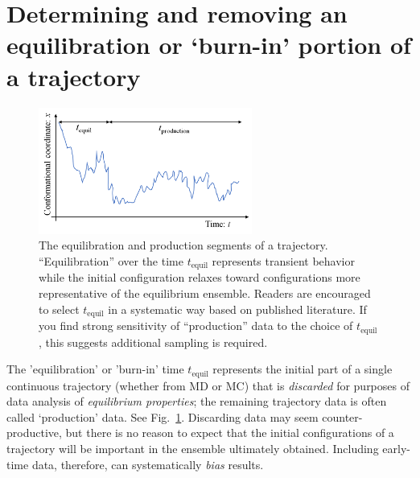 
\section{Determining and removing an equilibration or `burn-in' portion of a trajectory}
\label{sec:equil}

\begin{figure}
  \centering
  \includegraphics[width=7cm]{figures/tequil-time-trace}
  \caption{
  \label{fig:tequil}
  The equilibration and production segments of a trajectory.
  ``Equilibration'' over the time $t_{\mathrm{equil}}$ represents transient behavior while the initial configuration relaxes toward configurations more representative of the equilibrium ensemble.
  Readers are encouraged to select $t_{\mathrm{equil}}$ in a systematic way based on published literature.
  If you find strong sensitivity of ``production'' data to the choice of $t_{\mathrm{equil}}$, this suggests additional sampling is required.
  }
\end{figure}

The 'equilibration' or 'burn-in' time $t_{\mathrm{equil}}$ represents the initial part of a single continuous trajectory (whether from MD or MC) that is \emph{discarded} for purposes of data analysis of \emph{equilibrium properties};
the remaining trajectory data is often called `production' data.
See Fig.\ \ref{fig:tequil}.
Discarding data may seem counter-productive, but there is no reason to expect that the initial configurations of a trajectory will be important in the ensemble ultimately obtained.
Including early-time data, therefore, can systematically \emph{bias} results.


